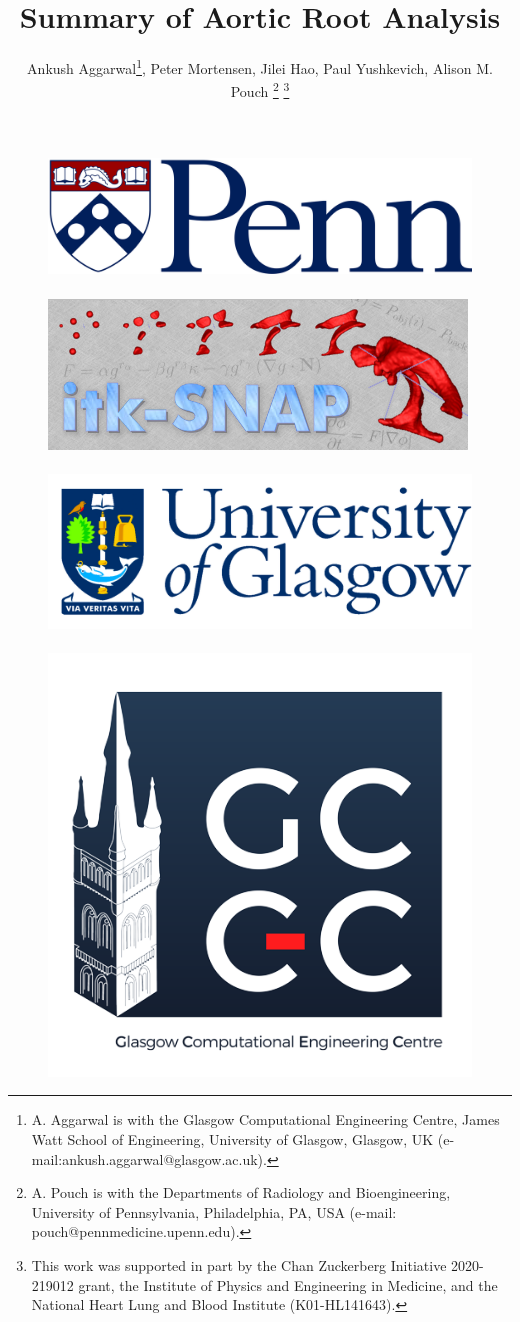 \documentclass{article}
\title{Summary of Aortic Root Analysis}
\author{Ankush Aggarwal\thanks{A. Aggarwal is with the
Glasgow Computational Engineering Centre, James Watt School of Engineering, University of Glasgow, Glasgow, UK (e-mail:ankush.aggarwal@glasgow.ac.uk). }, Peter Mortensen, Jilei Hao, Paul Yushkevich, Alison M. Pouch \thanks{A. Pouch is with the Departments of Radiology and Bioengineering, University of Pennsylvania, Philadelphia, PA, USA (e-mail: pouch@pennmedicine.upenn.edu).}
%
\thanks{This work was supported in part by the Chan Zuckerberg Initiative 2020-219012 grant, the Institute of Physics and Engineering in Medicine, and the National Heart Lung and Blood Institute (K01-HL141643).}
}
\begin{document}
\maketitle
\begin{figure}[t!]
\includegraphics[width = 0.25\linewidth]{UPennLogo}~~~~~\includegraphics[width = 0.25\linewidth]{ITKSnapLogo}~~~~~\includegraphics[width = 0.25\linewidth]{GlaLogo}~~~~~\includegraphics[width = 0.1\linewidth]{GCEC}
\end{figure}
\newpage
\end{document}
